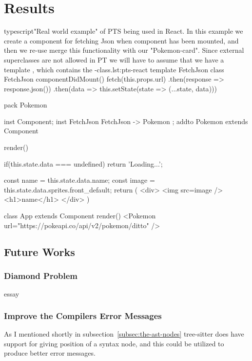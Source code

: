 \chapter{Results}\label{ch:results}

\begin{code}{typescript}{"Real world example" of PTS being used in React. In this example we create a component for fetching Json when component has been mounted, and then we re-use merge this functionality with our "Pokemon-card". Since external superclasses are not allowed in PT we will have to assume that we have a template , which contains the -class.}{lst:pts-react}
    template FetchJson {
        class FetchJson {
            componentDidMount() {
                fetch(this.props.url)
                    .then(response => response.json())
                    .then(data =>
                        this.setState(state => ({...state, data})))
            }
        }
    }

    pack Pokemon {
        inst Component;
        inst FetchJson { FetchJson -> Pokemon };
        addto Pokemon extends Component {
            render() {
                if(this.state.data === undefined)
                    return 'Loading...';

                const name = this.state.data.name;
                const image = this.state.data.sprites.front_default;
                return (
                    <div>
                        <img src={image} />
                        <h1>{name}</h1>
                    </div>
                )
            }
        }

        class App extends Component {
            render() {
                <Pokemon url="https://pokeapi.co/api/v2/pokemon/ditto" />
            }
        }
    }
\end{code}

\section{Future Works}\label{sec:future-works}

\subsection{Diamond Problem}\label{subsec:diamond-problem}

essay

\subsection{Improve the Compilers Error Messages}\label{subsec:compiler-with-focus-on-error-messages}

As I mentioned shortly in subsection~\vref{subsec:the-ast-nodes} tree-sitter does have support for giving position of a syntax node, and this could be utilized to produce better error messages.

